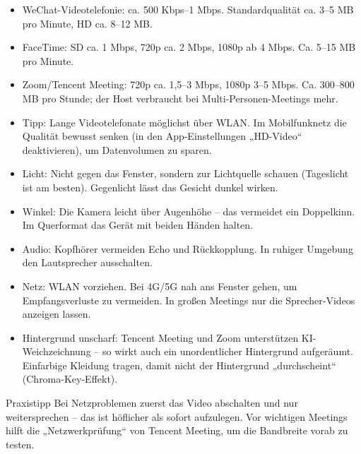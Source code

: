 
\begin{itemize}
  \item WeChat-Videotelefonie: ca. 500 Kbps–1 Mbps. Standardqualität ca. 3–5 MB pro Minute, HD ca. 8–12 MB.
  \item FaceTime: SD ca. 1 Mbps, 720p ca. 2 Mbps, 1080p ab 4 Mbps. Ca. 5–15 MB pro Minute.
  \item Zoom/Tencent Meeting: 720p ca. 1,5–3 Mbps, 1080p 3–5 Mbps. Ca. 300–800 MB pro Stunde; der Host verbraucht bei Multi-Personen-Meetings mehr.
  \item Tipp: Lange Videotelefonate möglichst über WLAN. Im Mobilfunknetz die Qualität bewusst senken (in den App-Einstellungen „HD-Video“ deaktivieren), um Datenvolumen zu sparen.
\end{itemize}


\begin{itemize}
  \item Licht: Nicht gegen das Fenster, sondern zur Lichtquelle schauen (Tageslicht ist am besten). Gegenlicht lässt das Gesicht dunkel wirken.
  \item Winkel: Die Kamera leicht über Augenhöhe – das vermeidet ein Doppelkinn. Im Querformat das Gerät mit beiden Händen halten.
  \item Audio: Kopfhörer vermeiden Echo und Rückkopplung. In ruhiger Umgebung den Lautsprecher ausschalten.
  \item Netz: WLAN vorziehen. Bei 4G/5G nah ans Fenster gehen, um Empfangsverluste zu vermeiden. In großen Meetings nur die Sprecher-Videos anzeigen lassen.
  \item Hintergrund unscharf: Tencent Meeting und Zoom unterstützen KI-Weichzeichnung – so wirkt auch ein unordentlicher Hintergrund aufgeräumt. Einfarbige Kleidung tragen, damit nicht der Hintergrund „durchscheint“ (Chroma-Key-Effekt).
\end{itemize}

\begin{tcbinfo}{Praxistipp}
Bei Netzproblemen zuerst das Video abschalten und nur weitersprechen – das ist höflicher als sofort aufzulegen. Vor wichtigen Meetings hilft die „Netzwerkprüfung“ von Tencent Meeting, um die Bandbreite vorab zu testen.

\end{tcbinfo}


